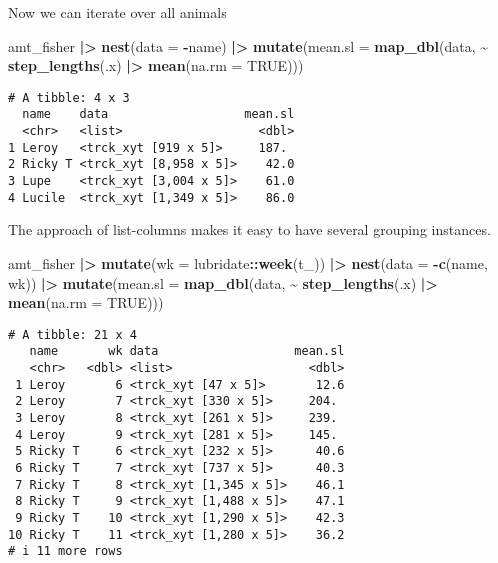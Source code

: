 \documentclass[ignorenonframetext,,t]{beamer}
\let\oldtextbf\textbf
\renewcommand{\textbf}[1]{\textcolor{spamwell}{\oldtextbf{#1}}}
\newenvironment{Shaded}{\begin{snugshade}}{\end{snugshade}}
\newcommand{\AttributeTok}[1]{\textcolor[rgb]{0.13,0.29,0.53}{#1}}
\newcommand{\ConstantTok}[1]{\textcolor[rgb]{0.56,0.35,0.01}{#1}}
\newcommand{\FunctionTok}[1]{\textcolor[rgb]{0.13,0.29,0.53}{\textbf{#1}}}
\newcommand{\NormalTok}[1]{#1}
\newcommand{\SpecialCharTok}[1]{\textcolor[rgb]{0.81,0.36,0.00}{\textbf{#1}}}
\begin{document}
\begin{frame}[fragile]
Now we can iterate over all animals

\begin{Shaded}
\begin{Highlighting}[]
\NormalTok{amt\_fisher }\SpecialCharTok{|\textgreater{}} \FunctionTok{nest}\NormalTok{(}\AttributeTok{data =} \SpecialCharTok{{-}}\NormalTok{name) }\SpecialCharTok{|\textgreater{}} 
  \FunctionTok{mutate}\NormalTok{(}\AttributeTok{mean.sl =} \FunctionTok{map\_dbl}\NormalTok{(data, }\SpecialCharTok{\textasciitilde{}} \FunctionTok{step\_lengths}\NormalTok{(.x) }\SpecialCharTok{|\textgreater{}} 
                             \FunctionTok{mean}\NormalTok{(}\AttributeTok{na.rm =} \ConstantTok{TRUE}\NormalTok{)))}
\end{Highlighting}
\end{Shaded}

\begin{verbatim}
# A tibble: 4 x 3
  name    data                   mean.sl
  <chr>   <list>                   <dbl>
1 Leroy   <trck_xyt [919 x 5]>     187. 
2 Ricky T <trck_xyt [8,958 x 5]>    42.0
3 Lupe    <trck_xyt [3,004 x 5]>    61.0
4 Lucile  <trck_xyt [1,349 x 5]>    86.0
\end{verbatim}
\end{frame}

\begin{frame}[fragile]
The approach of list-columns makes it easy to have several grouping
instances.

\begin{Shaded}
\begin{Highlighting}[]
\NormalTok{amt\_fisher }\SpecialCharTok{|\textgreater{}} \FunctionTok{mutate}\NormalTok{(}\AttributeTok{wk =}\NormalTok{ lubridate}\SpecialCharTok{::}\FunctionTok{week}\NormalTok{(t\_)) }\SpecialCharTok{|\textgreater{}} 
  \FunctionTok{nest}\NormalTok{(}\AttributeTok{data =} \SpecialCharTok{{-}}\FunctionTok{c}\NormalTok{(name, wk)) }\SpecialCharTok{|\textgreater{}} 
  \FunctionTok{mutate}\NormalTok{(}\AttributeTok{mean.sl =} \FunctionTok{map\_dbl}\NormalTok{(data, }\SpecialCharTok{\textasciitilde{}} \FunctionTok{step\_lengths}\NormalTok{(.x) }\SpecialCharTok{|\textgreater{}} 
                             \FunctionTok{mean}\NormalTok{(}\AttributeTok{na.rm =} \ConstantTok{TRUE}\NormalTok{)))}
\end{Highlighting}
\end{Shaded}

\begin{verbatim}
# A tibble: 21 x 4
   name       wk data                   mean.sl
   <chr>   <dbl> <list>                   <dbl>
 1 Leroy       6 <trck_xyt [47 x 5]>       12.6
 2 Leroy       7 <trck_xyt [330 x 5]>     204. 
 3 Leroy       8 <trck_xyt [261 x 5]>     239. 
 4 Leroy       9 <trck_xyt [281 x 5]>     145. 
 5 Ricky T     6 <trck_xyt [232 x 5]>      40.6
 6 Ricky T     7 <trck_xyt [737 x 5]>      40.3
 7 Ricky T     8 <trck_xyt [1,345 x 5]>    46.1
 8 Ricky T     9 <trck_xyt [1,488 x 5]>    47.1
 9 Ricky T    10 <trck_xyt [1,290 x 5]>    42.3
10 Ricky T    11 <trck_xyt [1,280 x 5]>    36.2
# i 11 more rows
\end{verbatim}
\end{frame}
\end{document}
